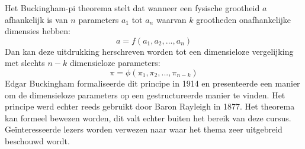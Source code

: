 Het Buckingham-pi theorema stelt dat wanneer een fysische grootheid $a$ afhankelijk is van $n$ parameters $a_1$ tot $a_n$ waarvan $k$ grootheden onafhankelijke dimensies hebben:
\begin{equation}
	a = f(a_1,a_2,...,a_n)
\end{equation}
Dan kan deze uitdrukking herschreven worden tot een dimensieloze vergelijking met slechts $n-k$ dimensieloze parameters:
\begin{equation}
	\pi = \phi(\pi_1,\pi_2,...,\pi_{n-k})
\end{equation}
Edgar Buckingham formaliseerde dit principe in 1914 en presenteerde een manier om de dimensieloze parameters op een gestructureerde manier te vinden. Het principe werd echter reeds gebruikt door Baron Rayleigh in 1877. Het theorema kan formeel bewezen worden, dit valt echter buiten het bereik van deze cursus. Geïnteresseerde lezers worden verwezen naar \cite{Yarin2012} waar het thema zeer uitgebreid beschouwd wordt.

